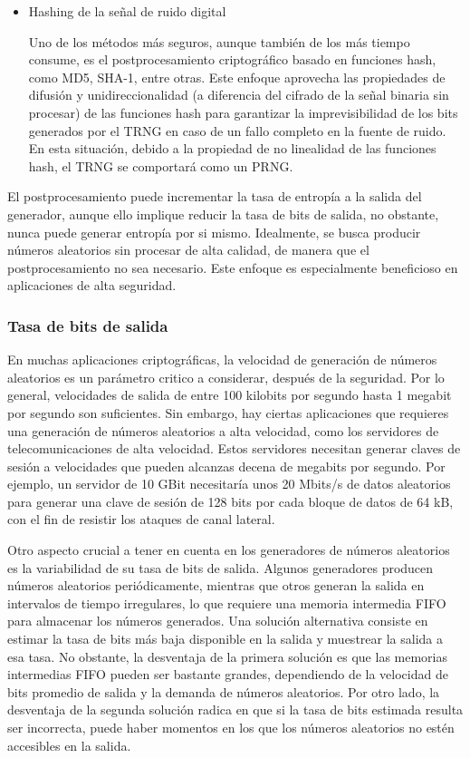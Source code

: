 \begin{itemize}
                
                \item Hashing de la señal de ruido digital

                    Uno de los métodos más seguros, aunque también de los más tiempo consume, es el postprocesamiento criptográfico basado en funciones hash, como MD5, SHA-1, entre otras. Este enfoque aprovecha las propiedades de difusión y unidireccionalidad (a diferencia del cifrado de la señal binaria sin procesar) de las funciones hash para garantizar la imprevisibilidad de los bits generados por el TRNG en caso de un fallo completo en la fuente de ruido. En esta situación, debido a la propiedad de no linealidad de las funciones hash, el TRNG se comportará como un PRNG.
                
            \end{itemize}
	
            El postprocesamiento puede incrementar la tasa de entropía a la salida del generador, aunque ello implique reducir la tasa de bits de salida, no obstante, nunca puede generar entropía por si mismo. Idealmente, se busca producir números aleatorios sin procesar de alta calidad, de manera que el postprocesamiento no sea necesario. Este enfoque es especialmente beneficioso en aplicaciones de alta seguridad.

            \subsubsection{Tasa de bits de salida}

            En muchas aplicaciones criptográficas, la velocidad de generación de números aleatorios es un parámetro critico a considerar, después de la seguridad. Por lo general, velocidades de salida de entre 100 kilobits por segundo hasta 1 megabit por segundo son suficientes. Sin embargo, hay ciertas aplicaciones que requieres una generación de números aleatorios a alta velocidad, como los servidores de telecomunicaciones de alta velocidad. Estos servidores necesitan generar claves de sesión a velocidades que pueden alcanzas decena de megabits por segundo. Por ejemplo, un servidor de 10 GBit necesitaría unos 20 Mbits/s de datos aleatorios para generar una clave de sesión de 128 bits por cada bloque de datos de 64 kB, con el fin de resistir los ataques de canal lateral.

            Otro aspecto crucial a tener en cuenta en los generadores de números aleatorios es la variabilidad de su tasa de bits de salida. Algunos generadores producen números aleatorios periódicamente, mientras que otros generan la salida en intervalos de tiempo irregulares, lo que requiere una memoria intermedia FIFO para almacenar los números generados. Una solución alternativa consiste en estimar la tasa de bits más baja disponible en la salida y muestrear la salida a esa tasa. No obstante, la desventaja de la primera solución es que las memorias intermedias FIFO pueden ser bastante grandes, dependiendo de la velocidad de bits promedio de salida y la demanda de números aleatorios. Por otro lado, la desventaja de la segunda solución radica en que si la tasa de bits estimada resulta ser incorrecta, puede haber momentos en los que los números aleatorios no estén accesibles en la salida.
	
